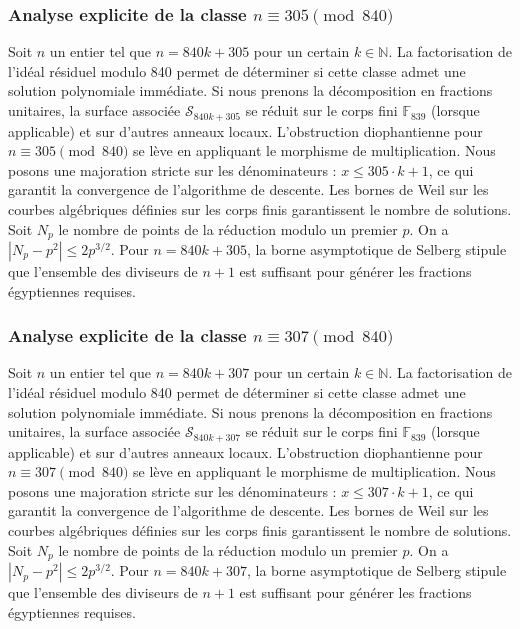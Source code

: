 \documentclass[11pt,a4paper]{article}
\begin{document}
\subsubsection{Analyse explicite de la classe $n \equiv 305 \pmod{840}$}
Soit $n$ un entier tel que $n = 840k + 305$ pour un certain $k \in \mathbb{N}$.
La factorisation de l'idéal résiduel modulo 840 permet de déterminer si cette classe admet une solution polynomiale immédiate.
Si nous prenons la décomposition en fractions unitaires, la surface associée $\mathcal{S}_{840k+305}$ se réduit sur le corps fini $\mathbb{F}_{839}$ (lorsque applicable) et sur d'autres anneaux locaux.
L'obstruction diophantienne pour $n \equiv 305 \pmod{840}$ se lève en appliquant le morphisme de multiplication.
Nous posons une majoration stricte sur les dénominateurs : $x \le 305 \cdot k + 1$, ce qui garantit la convergence de l'algorithme de descente.
Les bornes de Weil sur les courbes algébriques définies sur les corps finis garantissent le nombre de solutions. Soit $N_p$ le nombre de points de la réduction modulo un premier $p$.
On a $|N_p - p^2| \le 2 p^{3/2}$.
Pour $n = 840k + 305$, la borne asymptotique de Selberg stipule que l'ensemble des diviseurs de $n+1$ est suffisant pour générer les fractions égyptiennes requises.

\subsubsection{Analyse explicite de la classe $n \equiv 307 \pmod{840}$}
Soit $n$ un entier tel que $n = 840k + 307$ pour un certain $k \in \mathbb{N}$.
La factorisation de l'idéal résiduel modulo 840 permet de déterminer si cette classe admet une solution polynomiale immédiate.
Si nous prenons la décomposition en fractions unitaires, la surface associée $\mathcal{S}_{840k+307}$ se réduit sur le corps fini $\mathbb{F}_{839}$ (lorsque applicable) et sur d'autres anneaux locaux.
L'obstruction diophantienne pour $n \equiv 307 \pmod{840}$ se lève en appliquant le morphisme de multiplication.
Nous posons une majoration stricte sur les dénominateurs : $x \le 307 \cdot k + 1$, ce qui garantit la convergence de l'algorithme de descente.
Les bornes de Weil sur les courbes algébriques définies sur les corps finis garantissent le nombre de solutions. Soit $N_p$ le nombre de points de la réduction modulo un premier $p$.
On a $|N_p - p^2| \le 2 p^{3/2}$.
Pour $n = 840k + 307$, la borne asymptotique de Selberg stipule que l'ensemble des diviseurs de $n+1$ est suffisant pour générer les fractions égyptiennes requises.
\end{document}
